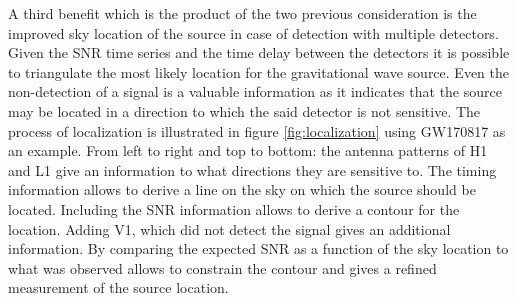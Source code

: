 A third benefit which is the product of the two previous consideration is the improved sky location of the source in case of detection with multiple detectors.
Given the SNR time series and the time delay between the detectors it is possible to triangulate the most likely location for the gravitational wave source.
Even the non-detection of a signal is a valuable information as it indicates that the source may be located in a direction to which the said detector is not sensitive.
The process of localization is illustrated in figure \ref{fig:localization} using GW170817 as an example.
From left to right and top to bottom: the antenna patterns of H1 and L1 give an information to what directions they are sensitive to.
The timing information allows to derive a line on the sky on which the source should be located.
Including the SNR information allows to derive a contour for the location.
Adding V1, which did not detect the signal gives an additional information.
By comparing the expected SNR as a function of the sky location to what was observed allows to constrain the contour and gives a refined measurement of the source location.

